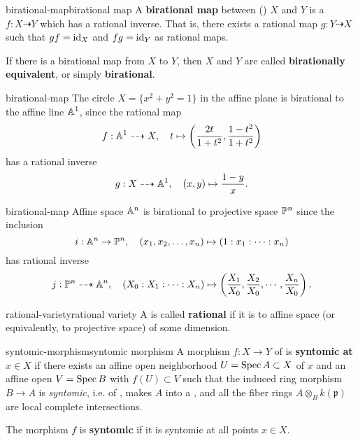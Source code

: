 \begin{topic}{birational-map}{birational map}
    A \textbf{birational map} between ()  $X$ and $Y$ is a  $f : X \dashrightarrow Y$ which has a rational inverse. That is, there exists a rational map $g : Y \dashrightarrow X$ such that $gf = \id_X$ and $fg = \id_Y$ as rational maps.
    
    If there is a birational map from $X$ to $Y$, then $X$ and $Y$ are called \textbf{birationally equivalent}, or simply \textbf{birational}.
\end{topic}

\begin{example}{birational-map}
    The circle $X = \{ x^2 + y^2 = 1 \}$ in the affine plane is birational to the affine line $\AA^1$, since the rational map
    \[ f : \AA^1 \dashrightarrow X, \quad t \mapsto \left(\frac{2t}{1 + t^2}, \frac{1 - t^2}{1 + t^2}\right) \]
    has a rational inverse
    \[ g : X \dashrightarrow \AA^1, \quad (x, y) \mapsto \frac{1 - y}{x} . \]
\end{example}

\begin{example}{birational-map}
    Affine space $\AA^n$ is birational to projective space $\PP^n$ since the inclusion
    \[ i : \AA^n \to \PP^n, \quad (x_1, x_2, \ldots, x_n) \mapsto (1 : x_1 : \cdots : x_n) \]
    has rational inverse
    \[ j : \PP^n \dashrightarrow \AA^n, \quad (X_0 : X_1 : \cdots : X_n) \mapsto \left(\frac{X_1}{X_0}, \frac{X_2}{X_0}, \cdots, \frac{X_n}{X_0}\right) . \]
\end{example}

\begin{topic}{rational-variety}{rational variety}
    A  is called \textbf{rational} if it is  to affine space (or equivalently, to projective space) of some dimension.
\end{topic}

\begin{topic}{syntomic-morphism}{syntomic morphism}
    A morphism $f : X \to Y$ of  is \textbf{syntomic at $x \in X$} if there exists an affine open neighborhood $U = \Spec A \subset X$ of $x$ and an affine open $V = \Spec B$ with $f(U) \subset V$ such that the induced ring morphism $B \to A$ is \textit{syntomic}, i.e. of , makes $A$ into a  , and all the fiber rings $A \otimes_B k(\mathfrak{p})$ are local complete intersections.
    
    The morphism $f$ is \textbf{syntomic} if it is syntomic at all points $x \in X$.
\end{topic}


